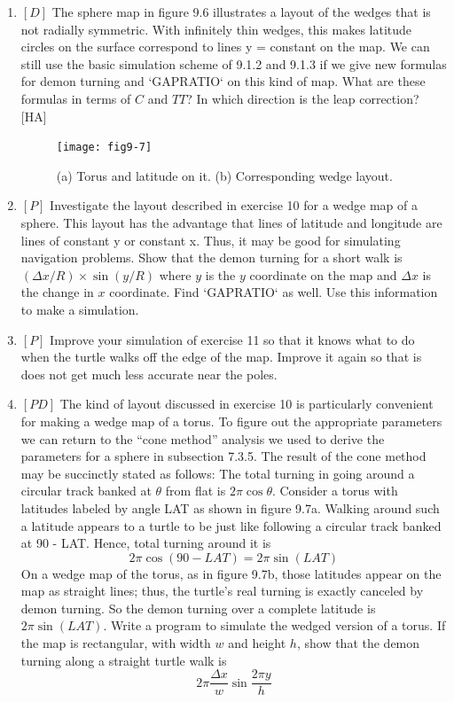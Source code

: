 \documentclass{book}
\begin{document}
\begin{enumerate}
\item $[D]$ The sphere map in figure 9.6 illustrates a layout of the wedges
that is not radially symmetric. With infinitely thin wedges, this makes
latitude circles on the surface correspond to lines y = constant on the
map. We can still use the basic simulation scheme of 9.1.2 and 9.1.3 if
we give new formulas for demon turning and \textsc{`GAPRATIO`} on this kind of
map. What are these formulas in terms of $C$ and $TT$? In which direction
is the leap correction? [HA]

\begin{figure}
\begin{center}
\texttt{[image: fig9-7]}
\caption{(a) Torus and latitude on it. (b) Corresponding wedge layout.}
\end{center}
\end{figure}

\item $[P]$ Investigate the layout described in exercise 10 for a wedge map
of a sphere. This layout has the advantage that lines of latitude and
longitude are lines of constant y or constant x. Thus, it may be good
for simulating navigation problems. Show that the demon turning for
a short walk is $(\Delta x / R) \times \sin (y / R)$ where $y$ is the $y$ coordinate on the
map and $ \Delta x $ is the change in $x$ coordinate. Find \textsc{`GAPRATIO`} as well. Use
this information to make a simulation.

\item $[P]$ Improve your simulation of exercise 11 so that it knows what to
do when the turtle walks off the edge of the map. Improve it again so
that is does not get much less accurate near the poles.

\item $[PD]$ The kind of layout discussed in exercise 10 is particularly
convenient for making a wedge map of a torus. To figure out the
appropriate parameters we can return to the ``cone method'' analysis
we used to derive the parameters for a sphere in subsection 7.3.5. The
result of the cone method may be succinctly stated as follows: The total
turning in going around a circular track banked at $\theta$ from flat is $2 \pi \cos \theta $.
Consider a torus with latitudes labeled by angle LAT as shown in figure
9.7a. Walking around such a latitude appears to a turtle to be just like
following a circular track banked at 90 - LAT. Hence, total turning
around it is
$$2 \pi \cos (90 - LAT)= 2 \pi \sin (LAT)$$
On a wedge map of the torus, as in figure 9.7b, those latitudes appear
on the map as straight lines; thus, the turtle's real turning is exactly
canceled by demon turning. So the demon turning over a complete
latitude is $2 \pi \sin (LAT)$. Write a program to simulate the wedged version
of a torus. If the map is rectangular, with width $w$ and height $h$, show
that the demon turning along a straight turtle walk is
$$ 2 \pi \frac {\Delta x} {w} \sin \frac {2 \pi y} {h} $$


\end{enumerate}
\end{document}
